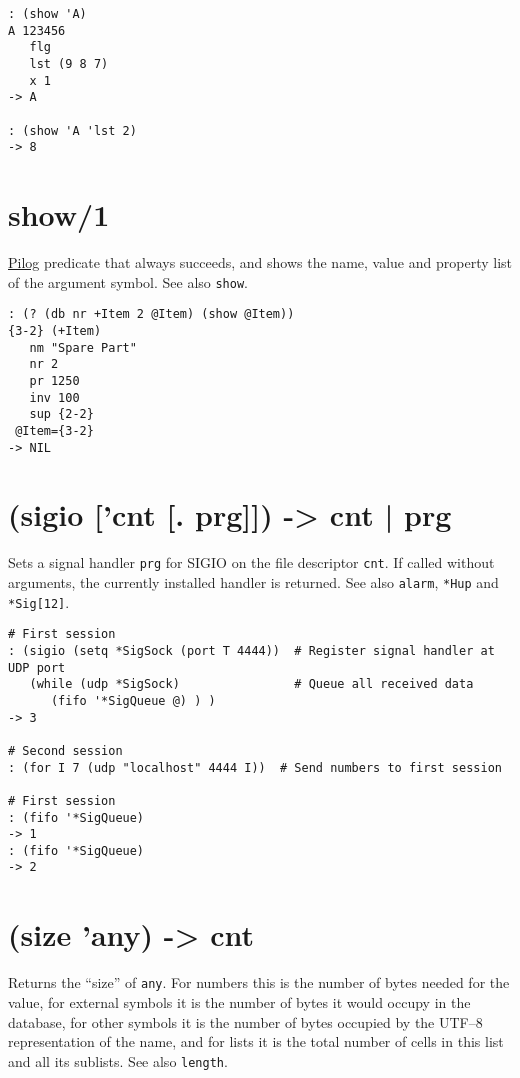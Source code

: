 {{{{{{{{\begin{verbatim}
: (show 'A)
A 123456
   flg
   lst (9 8 7)
   x 1
-> A

: (show 'A 'lst 2)
-> 8
\end{verbatim}

 
\section{show/1}
\label{sec-8-1-19-22}


\hyperref[ref.html-pilog]{Pilog} predicate that always succeeds, and shows the
name, value and property list of the argument symbol. See also \texttt{show}.


\begin{verbatim}
: (? (db nr +Item 2 @Item) (show @Item))
{3-2} (+Item)
   nm "Spare Part"
   nr 2
   pr 1250
   inv 100
   sup {2-2}
 @Item={3-2}
-> NIL
\end{verbatim}

 
\section{(sigio ['cnt [. prg]]) -> cnt | prg}
\label{sec-8-1-19-23}


Sets a signal handler \texttt{prg} for SIGIO on the file descriptor \texttt{cnt}. If
called without arguments, the currently installed handler is returned.
See also \texttt{alarm}, \texttt{*Hup} and \texttt{*Sig[12]}.


\begin{verbatim}
# First session
: (sigio (setq *SigSock (port T 4444))  # Register signal handler at UDP port
   (while (udp *SigSock)                # Queue all received data
      (fifo '*SigQueue @) ) )
-> 3

# Second session
: (for I 7 (udp "localhost" 4444 I))  # Send numbers to first session

# First session
: (fifo '*SigQueue)
-> 1
: (fifo '*SigQueue)
-> 2
\end{verbatim}

 
\section{(size 'any) -> cnt}
\label{sec-8-1-19-24}


Returns the ``size'' of \texttt{any}. For numbers this is the number of bytes
needed for the value, for external symbols it is the number of bytes it
would occupy in the database, for other symbols it is the number of
bytes occupied by the UTF--8 representation of the name, and for lists
it is the total number of cells in this list and all its sublists. See
also \texttt{length}.


}}}}}}}}

